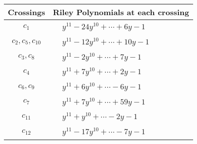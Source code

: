 \documentclass[1p]{elsarticle_modified}
\theoremstyle{definition}
\begin{document}
\begin{tabular}{m{50pt}|m{274pt}}
Crossings & \hspace{64pt}Riley Polynomials at each crossing \\
\hline $$\begin{aligned}c_{1}\end{aligned}$$&$\begin{aligned}
&y^{11}-24 y^{10}+\cdots+6 y-1
\end{aligned}$\\
\hline $$\begin{aligned}c_{2},c_{5},c_{10}\end{aligned}$$&$\begin{aligned}
&y^{11}-12 y^{10}+\cdots+10 y-1
\end{aligned}$\\
\hline $$\begin{aligned}c_{3},c_{8}\end{aligned}$$&$\begin{aligned}
&y^{11}-2 y^{10}+\cdots+7 y-1
\end{aligned}$\\
\hline $$\begin{aligned}c_{4}\end{aligned}$$&$\begin{aligned}
&y^{11}+7 y^{10}+\cdots+2 y-1
\end{aligned}$\\
\hline $$\begin{aligned}c_{6},c_{9}\end{aligned}$$&$\begin{aligned}
&y^{11}+6 y^{10}+\cdots-6 y-1
\end{aligned}$\\
\hline $$\begin{aligned}c_{7}\end{aligned}$$&$\begin{aligned}
&y^{11}+7 y^{10}+\cdots+59 y-1
\end{aligned}$\\
\hline $$\begin{aligned}c_{11}\end{aligned}$$&$\begin{aligned}
&y^{11}+y^{10}+\cdots-2 y-1
\end{aligned}$\\
\hline $$\begin{aligned}c_{12}\end{aligned}$$&$\begin{aligned}
&y^{11}-17 y^{10}+\cdots-7 y-1
\end{aligned}$\\
\hline
\end{tabular}\\~\\
\end{document}
